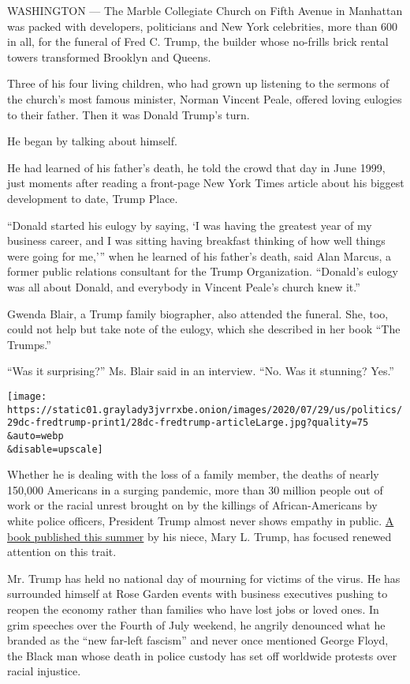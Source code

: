WASHINGTON --- The Marble Collegiate Church on Fifth Avenue in Manhattan
was packed with developers, politicians and New York celebrities, more
than 600 in all, for the funeral of Fred C. Trump, the builder whose
no-frills brick rental towers transformed Brooklyn and Queens.

Three of his four living children, who had grown up listening to the
sermons of the church's most famous minister, Norman Vincent Peale,
offered loving eulogies to their father. Then it was Donald Trump's
turn.

He began by talking about himself.

He had learned of his father's death, he told the crowd that day in June
1999, just moments after reading a front-page New York Times article
about his biggest development to date, Trump Place.

``Donald started his eulogy by saying, `I was having the greatest year
of my business career, and I was sitting having breakfast thinking of
how well things were going for me,''' when he learned of his father's
death, said Alan Marcus, a former public relations consultant for the
Trump Organization. ``Donald's eulogy was all about Donald, and
everybody in Vincent Peale's church knew it.''

Gwenda Blair, a Trump family biographer, also attended the funeral. She,
too, could not help but take note of the eulogy, which she described in
her book ``The Trumps.''

``Was it surprising?'' Ms. Blair said in an interview. ``No. Was it
stunning? Yes.''

\texttt{[image: https://static01.graylady3jvrrxbe.onion/images/2020/07/29/us/politics/29dc-fredtrump-print1/28dc-fredtrump-articleLarge.jpg?quality=75\\\&auto=webp\\\&disable=upscale]}

Whether he is dealing with the loss of a family member, the deaths of
nearly 150,000 Americans in a surging pandemic, more than 30 million
people out of work or the racial unrest brought on by the killings of
African-Americans by white police officers, President Trump almost never
shows empathy in public.
\href{https://www.nytimes3xbfgragh.onion/2020/07/07/nyregion/mary-trump-book.html}{A
book published this summer} by his niece, Mary L. Trump, has focused
renewed attention on this trait.

Mr. Trump has held no national day of mourning for victims of the virus.
He has surrounded himself at Rose Garden events with business executives
pushing to reopen the economy rather than families who have lost jobs or
loved ones. In grim speeches over the Fourth of July weekend, he angrily
denounced what he branded as the ``new far-left fascism'' and never once
mentioned George Floyd, the Black man whose death in police custody has
set off worldwide protests over racial injustice.

